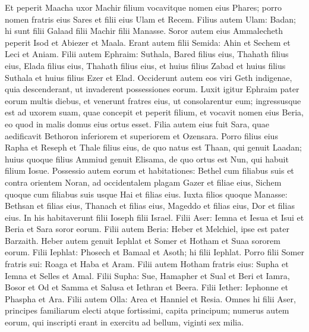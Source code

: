 \begin{biblechapter}
\verse Et peperit Maacha uxor Machir filium vocavitque nomen eius Phares; porro nomen fratris eius Sares et filii eius Ulam et Recem.  
\verse Filius autem Ulam: Badan; hi sunt filii Galaad filii Machir filii Manasse.  
\verse Soror autem eius Ammalecheth peperit Isod et Abiezer et Maala. 
\verse Erant autem filii Semida: Ahin et Sechem et Leci et Aniam. 
\verse Filii autem Ephraim: Suthala, Bared filius eius, Thahath filius eius, Elada filius eius, Thahath filius eius, 
\verse et huius filius Zabad et huius filius Suthala et huius filius Ezer et Elad. Occiderunt autem eos viri Geth indigenae, quia descenderant, ut invaderent possessiones eorum. 
\verse Luxit igitur Ephraim pater eorum multis diebus, et venerunt fratres eius, ut consolarentur eum;  
\verse ingressusque est ad uxorem suam, quae concepit et peperit filium, et vocavit nomen eius Beria, eo quod in malis domus eius ortus esset. 
\verse Filia autem eius fuit Sara, quae aedificavit Bethoron inferiorem et superiorem et Ozensara.  
\verse Porro filius eius Rapha et Reseph et Thale filius eius, de quo natus est Thaan, 
\verse qui genuit Laadan; huius quoque filius Ammiud genuit Elisama, 
\verse de quo ortus est Nun, qui habuit filium Iosue. 
\verse Possessio autem eorum et habitationes: Bethel cum filiabus suis et contra orientem Noran, ad occidentalem plagam Gazer et filiae eius, Sichem quoque cum filiabus suis usque Hai et filias eius. 
\verse Iuxta filios quoque Manasse: Bethsan et filias eius, Thanach et filias eius, Mageddo et filias eius, Dor et filias eius. In his habitaverunt filii Ioseph filii Israel. 
\verse Filii Aser: Iemna et Iesua et Isui et Beria et Sara soror eorum. 
\verse Filii autem Beria: Heber et Melchiel, ipse est pater Barzaith. 
\verse Heber autem genuit Iephlat et Somer et Hotham et Suaa sororem eorum. 
\verse Filii Iephlat: Phosech et Bamaal et Asoth; hi filii Iephlat. 
\verse Porro filii Somer fratris sui: Roaga et Haba et Aram. 
\verse Filii autem Hotham fratris eius: Supha et Iemna et Selles et Amal. 
\verse Filii Supha: Sue, Hamapher et Sual et Beri et Iamra, 
\verse Bosor et Od et Samma et Salusa et Iethran et Beera. 
\verse Filii Iether: Iephonne et Phaspha et Ara. 
\verse Filii autem Olla: Area et Hanniel et Resia. 
\verse Omnes hi filii Aser, principes familiarum electi atque fortissimi, capita principum; numerus autem eorum, qui inscripti erant in exercitu ad bellum, viginti sex milia. 
\end{biblechapter}

